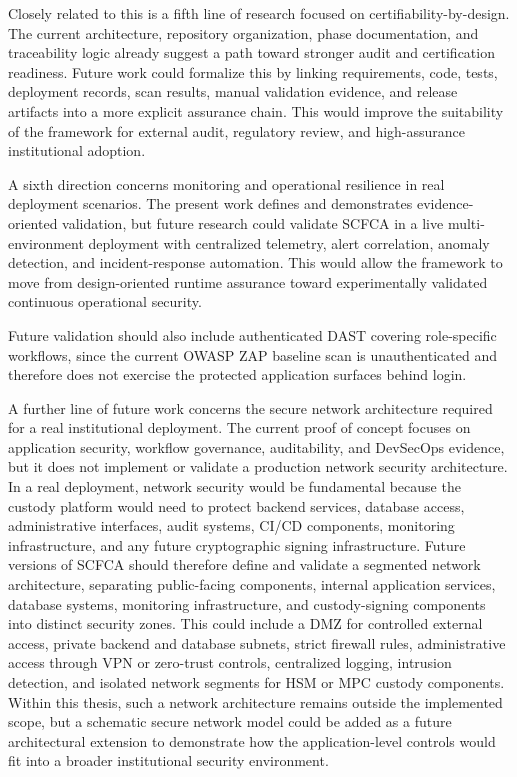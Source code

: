 \documentclass[12pt,a4paper]{report}
\begin{document}
Closely related to this is a fifth line of research focused on certifiability-by-design. The current architecture, repository organization, phase documentation, and traceability logic already suggest a path toward stronger audit and certification readiness. Future work could formalize this by linking requirements, code, tests, deployment records, scan results, manual validation evidence, and release artifacts into a more explicit assurance chain. This would improve the suitability of the framework for external audit, regulatory review, and high-assurance institutional adoption.

A sixth direction concerns monitoring and operational resilience in real deployment scenarios. The present work defines and demonstrates evidence-oriented validation, but future research could validate SCFCA in a live multi-environment deployment with centralized telemetry, alert correlation, anomaly detection, and incident-response automation. This would allow the framework to move from design-oriented runtime assurance toward experimentally validated continuous operational security.

Future validation should also include authenticated DAST covering role-specific workflows, since the current OWASP ZAP baseline scan is unauthenticated and therefore does not exercise the protected application surfaces behind login.

A further line of future work concerns the secure network architecture required for a real institutional deployment. The current proof of concept focuses on application security, workflow governance, auditability, and DevSecOps evidence, but it does not implement or validate a production network security architecture. In a real deployment, network security would be fundamental because the custody platform would need to protect backend services, database access, administrative interfaces, audit systems, CI/CD components, monitoring infrastructure, and any future cryptographic signing infrastructure. Future versions of SCFCA should therefore define and validate a segmented network architecture, separating public-facing components, internal application services, database systems, monitoring infrastructure, and custody-signing components into distinct security zones. This could include a DMZ for controlled external access, private backend and database subnets, strict firewall rules, administrative access through VPN or zero-trust controls, centralized logging, intrusion detection, and isolated network segments for HSM or MPC custody components. Within this thesis, such a network architecture remains outside the implemented scope, but a schematic secure network model could be added as a future architectural extension to demonstrate how the application-level controls would fit into a broader institutional security environment.
\end{document}
